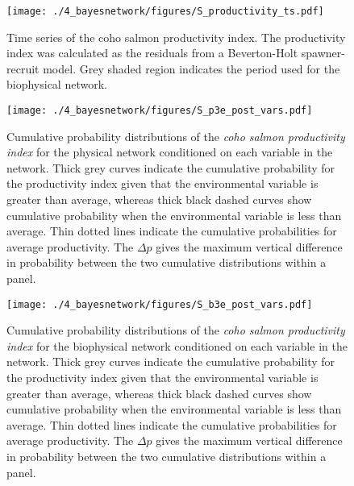 \begin{figure}[htbp]
  \centering \texttt{[image: ./4\_bayesnetwork/figures/S\_productivity\_ts.pdf]}
  \caption[Time series of the coho salmon productivity index.]{Time series of
    the coho salmon productivity index. The productivity index was calculated as
    the residuals from a Beverton-Holt spawner-recruit model. Grey shaded region
    indicates the period used for the biophysical network.}
  \label{fig:bn:s1}
\end{figure}

\begin{figure}[htbp]
  \centering \texttt{[image: ./4\_bayesnetwork/figures/S\_p3e\_post\_vars.pdf]}
  \caption[Cumulative probability distributions of the coho salmon
    productivity index for the physical network conditioned on each variable in
    the network.]{Cumulative probability distributions of the \emph{coho salmon
    productivity index} for the physical network conditioned on each variable in
    the network. Thick grey curves indicate the cumulative probability for the
    productivity index given that the environmental variable is greater than
    average, whereas thick black dashed curves show cumulative probability when
    the environmental variable is less than average. Thin dotted lines indicate
    the cumulative probabilities for average productivity. The \(\Delta p\)
    gives the maximum vertical difference in probability between the two
    cumulative distributions within a panel.}
  \label{fig:bn:s2}
\end{figure}

\begin{figure}[htbp]
  \centering \texttt{[image: ./4\_bayesnetwork/figures/S\_b3e\_post\_vars.pdf]}
  \caption[Cumulative probability distributions of the coho salmon productivity
    index for the biophysical network conditioned on each variable in the
    network.]{Cumulative probability distributions of the \emph{coho salmon
    productivity index} for the biophysical network conditioned on each variable
    in the network. Thick grey curves indicate the cumulative probability for
    the productivity index given that the environmental variable is greater than
    average, whereas thick black dashed curves show cumulative probability when
    the environmental variable is less than average. Thin dotted lines indicate
    the cumulative probabilities for average productivity. The \(\Delta p\)
    gives the maximum vertical difference in probability between the two
    cumulative distributions within a panel.}
  \label{fig:bn:s3}
\end{figure}

